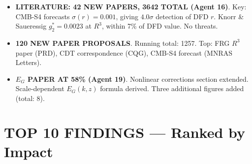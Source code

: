 \documentclass[11pt,a4paper]{article}
\begin{document}
\begin{itemize}
\item \textbf{LITERATURE: 42 NEW PAPERS, 3642 TOTAL (Agent 16)}. Key: CMB-S4 forecasts $\sigma(r) = 0.001$, giving $4.0\sigma$ detection of DFD $r$. Knorr \& Saueressig $g_2^* = 0.0023$ at $R^3$, within 7\% of DFD value. No threats.

\item \textbf{120 NEW PAPER PROPOSALS}. Running total: 1257. Top: FRG $R^3$ paper (PRD), CDT correspondence (CQG), CMB-S4 forecast (MNRAS Letters).

\item \textbf{$E_G$ PAPER AT 58\% (Agent 19)}. Nonlinear corrections section extended. Scale-dependent $E_G(k,z)$ formula derived. Three additional figures added (total: 8).
\end{itemize}

\section{TOP 10 FINDINGS --- Ranked by Impact}
\label{sec:top10}
\end{document}

